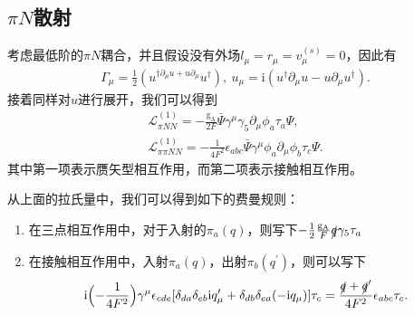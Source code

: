 \documentclass[aps,tightenlines,16pt]{ctexart}
\numberwithin{equation}{section}
\newcommand{\mL}{\mathcal{L}}
\begin{document}
\subsection{$\pi N$散射}


考虑最低阶的$\pi N$耦合，并且假设没有外场$l_{\mu}=r_{\mu}=v_{\mu}^{(s)}=0$，因此有
\begin{align}
   \Gamma_{\mu}=\frac{1}{2}(u^{\dagger\partial_{\mu}u+u\partial_{\mu}}u^{\dagger}),\ u_{\mu}=\mbox{i}(u^{\dagger}\partial_{\mu}u-u\partial_{\mu}u^{\dagger}).
\end{align}
接着同样对$u$进行展开，我们可以得到
\begin{align}
   \mL_{\pi N N}^{(1)}=-\frac{\mathrm{g_A}}{2F}\bar{\Psi}\gamma^{\mu}\gamma_5\partial_{\mu}\phi_a\tau_a \Psi,\\
   \mL_{\pi\pi N N}^{(1)}=-\frac{1}{4F^2}\epsilon_{abc}\bar{\Psi}\gamma^{\mu}\phi_a\partial_{\mu}\phi_b\tau_c \Psi.
\end{align}
其中第一项表示赝矢型相互作用，而第二项表示接触相互作用。

从上面的拉氏量中，我们可以得到如下的费曼规则：
\begin{enumerate}
   \item 在三点相互作用中，对于入射的$\pi_a(q)$，则写下$-\frac{1}{2}\frac{\mathrm{g_A}}{F}\slashed{q}\gamma_5\tau_a$
   \item 在接触相互作用中，入射$\pi_a(q)$，出射$\pi_b(q^{\prime})$，则可以写下
   \begin{align}
      \mbox{i}\Bigl(-\frac{1}{4F^2}\Bigr)\gamma^{\mu}\epsilon_{cde}[\delta_{da}\delta_{eb}\mbox{i}q^{\prime}_{\mu}+\delta_{db}\delta_{ea}(-\mbox{i}q_{\mu})]\tau_c = \frac{\slashed{q}+\slashed{q}^{\prime}}{4F^2}\epsilon_{abc}\tau_c.
   \end{align}
\end{enumerate}
\end{document}
